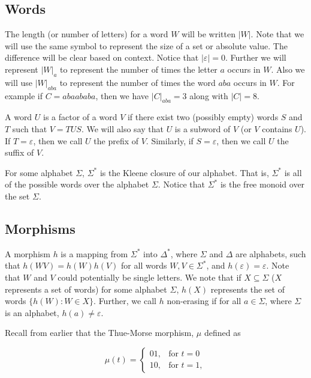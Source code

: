 \documentclass[12pt]{amsart}
\theoremstyle{definition}
\theoremstyle{plain}
\theoremstyle{nameit}
\theoremstyle{plain}
\begin{document}
\begin{onehalfspace}
\subsection{Words}

The length (or number of letters) for a word $W$ will be written $|W|$. Note that we will use the same
symbol to represent the size of a set or absolute value. The difference will be clear based on context.
Notice that $|\varepsilon| = 0$. Further we will represent $|W|_a$ to represent the number of times the
letter $a$ occurs in $W$. Also we will use $|W|_{aba}$ to represent the number of times the word $aba$
occurs in $W$. For example if $C = abaababa$, then we have $|C|_{aba} = 3$ along with $|C| = 8$.

A word $U$ is a factor of a word $V$ if there exist two (possibly empty) words $S$ and $T$ such that $V =
TUS$. We will also say that $U$ is a subword of $V$ (or $V$ contains $U$). If $T=\varepsilon$, then we
call $U$ the prefix of $V$. Similarly, if $S = \varepsilon$, then we call $U$ the suffix of $V$.

For some alphabet $\Sigma$, $\Sigma^*$ is the Kleene closure of our alphabet. That is, $\Sigma^*$ is all
of the possible words over the alphabet $\Sigma$. Notice that $\Sigma^*$ is the free monoid over the set
$\Sigma$.

\subsection{Morphisms}

A morphism $h$ is a mapping from $\Sigma^*$ into $\Delta^*$, where $\Sigma$ and $\Delta$ are
alphabets, such that $h(WV) = h(W)h(V)$ for all
words $W,V\in\Sigma^*$, and $h(\varepsilon) = \varepsilon$. Note that $W$ and $V$ could
potentially be single letters. We note that if $X\subseteq\Sigma$ ($X$ represents a set of words) for some
alphabet $\Sigma$, $h(X)$ represents the set of words $\{h(W):W\in X\}$. Further, we call $h$
non-erasing if for all $a\in\Sigma$, where $\Sigma$ is an alphabet, $h(a)\neq\varepsilon$.

Recall from earlier that the Thue-Morse morphism, $\mu$ defined as

\vspace{\baselineskip}
\begin{singlespace}
\begin{displaymath}
\mu(t) =
\begin{cases}
01, & \textrm{for } t=0\\
10, & \textrm{for } t=1,
\end{cases}
\end{displaymath}
\end{singlespace}
\vspace{\baselineskip}


\end{onehalfspace}
\end{document}
